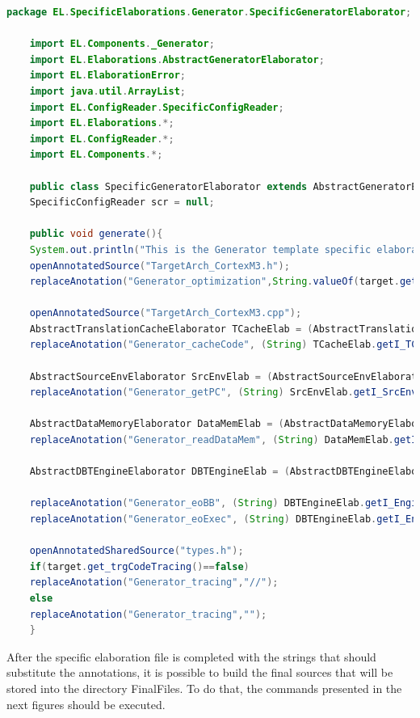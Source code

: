 \documentclass[11pt]{report}
\begin{document}
	\begin{lstlisting}[language=Java]
	package EL.SpecificElaborations.Generator.SpecificGeneratorElaborator;  
	
	import EL.Components._Generator;
	import EL.Elaborations.AbstractGeneratorElaborator;
	import EL.ElaborationError;
	import java.util.ArrayList;
	import EL.ConfigReader.SpecificConfigReader;
	import EL.Elaborations.*;
	import EL.ConfigReader.*;
	import EL.Components.*;
	
	public class SpecificGeneratorElaborator extends AbstractGeneratorElaborator {
	SpecificConfigReader scr = null;
	
	public void generate(){
	System.out.println("This is the Generator template specific elaboration.");
	openAnnotatedSource("TargetArch_CortexM3.h");
	replaceAnotation("Generator_optimization",String.valueOf(target.get_optimizations()));
	
	openAnnotatedSource("TargetArch_CortexM3.cpp");		
	AbstractTranslationCacheElaborator TCacheElab = (AbstractTranslationCacheElaborator) getElaborator((_TranslationCache) target.get_r_TCache());
	replaceAnotation("Generator_cacheCode", (String) TCacheElab.getI_TCacheElaboratorCacheCode());
	
	AbstractSourceEnvElaborator SrcEnvElab = (AbstractSourceEnvElaborator) getElaborator((_SourceEnv) target.get_r_SrcEnv());
	replaceAnotation("Generator_getPC", (String) SrcEnvElab.getI_SrcEnvElaboratorGetPC());
	
	AbstractDataMemoryElaborator DataMemElab = (AbstractDataMemoryElaborator) getElaborator((_DataMemory) target.get_r_DMem());
	replaceAnotation("Generator_readDataMem", (String) DataMemElab.getI_DMemElaboratorReadDataMem());
	
	AbstractDBTEngineElaborator DBTEngineElab = (AbstractDBTEngineElaborator) getElaborator((_DBTEngine) target.get_r_EngineState());		
	
	replaceAnotation("Generator_eoBB", (String) DBTEngineElab.getI_EngineStateElaboratorEoBB());
	replaceAnotation("Generator_eoExec", (String) DBTEngineElab.getI_EngineStateElaboratorEoExec());
	
	openAnnotatedSharedSource("types.h");
	if(target.get_trgCodeTracing()==false)
	replaceAnotation("Generator_tracing","//");
	else
	replaceAnotation("Generator_tracing","");
	}
	\end{lstlisting}
	
	After the specific elaboration file is completed with the strings that should substitute the annotations, it is possible to build the final sources that will be stored into the directory FinalFiles. To do that, the commands presented in the next figures should be executed.
	
\end{document}

